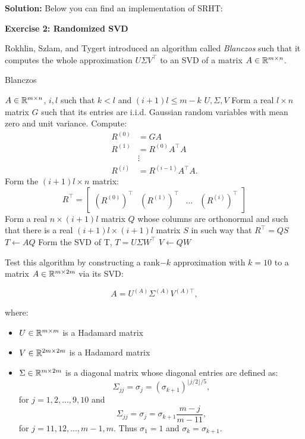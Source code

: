 \documentclass[11pt]{article}
\begin{document}
\textbf{Solution:} Below you can find an implementation of SRHT:



\bigskip

{\bf{Exercise 2: Randomized SVD}}

Rokhlin, Szlam, and Tygert introduced an algorithm called \textit{Blanczos} such that it computes the whole approximation $U \Sigma V^\top$ to an SVD of a matrix $A \in \mathbb{R}^{m \times n}$.

\scriptsize
\begin{algorithm}
\caption{Blanczos}\label{Blanczos}
\begin{algorithmic}
\Input $A \in \mathbb{R}^{m \times n}$, $i, l$ such that $k < l$ and $(i+1)l \leq m-k$
\Output $U, \Sigma, V$
\State Form a real $l \times n$ matrix $G$ such that its entries are i.i.d. Gaussian random variables with mean zero and unit variance. Compute:
\begin{equation*}
    \begin{split}
        R^{(0)} & = GA \\
        R^{(1)} & = R^{(0)} A^\top A \\
        & \vdots \\
        R^{(i)} & = R^{(i-1)} A^\top A.
    \end{split}
\end{equation*}
\State Form the $(i + 1)l \times n$ matrix:
\[ R^\top = \begin{bmatrix} (R^{(0)})^\top & (R^{(1)})^\top & \hdots & (R^{(i)})^\top \end{bmatrix} \]
\State Form a real $n \times (i+1)l$ matrix $Q$ whose columns are orthonormal and such that there is a real $(i+1)l \times (i+1)l$ matrix $S$ in such way that $R^\top = QS$
\State $T \gets AQ$
\State Form the SVD of T, $T = U \Sigma W^\top$
\State $V \gets QW$
\end{algorithmic}
\end{algorithm}
\normalsize

Test this algorithm by constructing a rank$-k$ approximation with $k = 10$ to a matrix $A \in \mathbb{R}^{m \times 2m}$ via its SVD:

\[ A = U^{(A)} \Sigma^{(A)} V^{(A)\top}, \]

where:

\begin{itemize}
    \item $U \in \mathbb{R}^{m \times m}$ is a Hadamard matrix
    \item $V \in \mathbb{R}^{2m \times 2m}$ is a Hadamard matrix
    \item $\Sigma \in \mathbb{R}^{m \times 2m}$ is a diagonal matrix whose diagonal entries are defined as:
    \[ \Sigma_{jj} = \sigma_j = (\sigma_{k+1})^{\lfloor j/2 \rfloor / 5}, \]
    for $j = 1, 2, ..., 9, 10$ and
    \[ \Sigma_{jj} = \sigma_j = \sigma_{k+1} \frac{m-j}{m-11}, \]
    for $j = 11, 12, ..., m-1, m$. Thus $\sigma_1 = 1$ and $\sigma_k = \sigma_{k+1}$.
\end{itemize}
\end{document}
